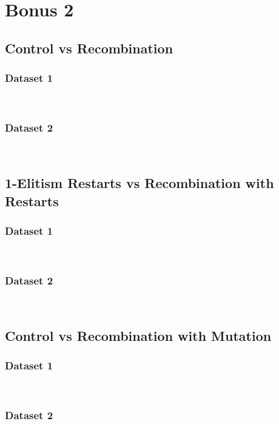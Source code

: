 \documentclass{article}
\begin{document}
\section{Bonus 2}

\subsection{Control vs Recombination}
\subsubsection{Dataset 1}
\begin{paragraph}
\\
\end{paragraph}
\subsubsection{Dataset 2}
\begin{paragraph}
\\
\end{paragraph}
\subsection{1-Elitism Restarts vs Recombination with Restarts}
\subsubsection{Dataset 1}
\begin{paragraph}
\\
\end{paragraph}
\subsubsection{Dataset 2}
\begin{paragraph}
\\
\end{paragraph}
\subsection{Control vs Recombination with Mutation}
\subsubsection{Dataset 1}
\begin{paragraph}
\\
\end{paragraph}
\subsubsection{Dataset 2}
\begin{paragraph}
\\
\end{paragraph}
\end{document}
